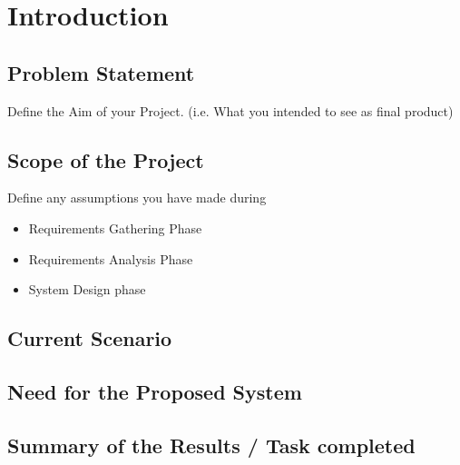 \chapter{Introduction}
\section{Problem Statement}
Define the Aim of your Project. (i.e. What you intended to see as final product)
\section{Scope of the Project}
Define any assumptions you have made during 
\begin{itemize}
\item Requirements Gathering Phase
\item Requirements Analysis Phase
\item System Design phase
\end{itemize}
\section{Current Scenario}
\section{Need for the Proposed System}
\section{Summary of the Results / Task completed }




  